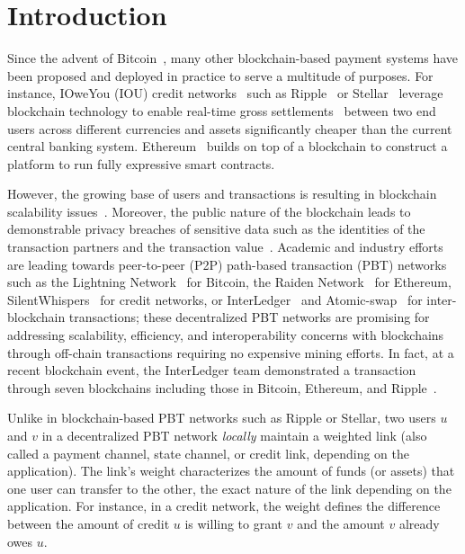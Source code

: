 \vspace{-1em}

\section{Introduction}
\label{sec:intro}

Since the advent of Bitcoin~\cite{nakamoto2011bitcoin}, many other blockchain-based 
payment systems have been proposed and deployed in practice to serve a multitude 
of purposes. For instance, IOweYou (IOU) credit networks~\cite{defigueiredo05trustdavis,Ghosh07} 
such as Ripple~\cite{ripple,armknecht2015ripple} 
or Stellar~\cite{stellar} leverage blockchain technology to enable 
real-time gross settlements~\cite{RTGS} between two end users  
across different currencies and assets significantly cheaper than the current central banking system. 
Ethereum~\cite{ethereum} builds on top of a blockchain 
to construct a platform to run fully expressive smart contracts.

However, the growing base of users and transactions is resulting in
blockchain scalability issues~\cite{Croman2016, poon2015bitcoin}. Moreover, the public nature of the blockchain 
leads to demonstrable privacy breaches of sensitive data such as the identities of the transaction partners and the transaction value~\cite{moreno2016listening, Meiklejohn2013, Kumar2017, Miller17,reid2013analysis}. 
Academic and industry efforts are leading towards peer-to-peer (P2P) %
path-based transaction (PBT) networks such as the Lightning Network~\cite{poon2015bitcoin} for Bitcoin, 
the Raiden Network~\cite{raiden} for Ethereum, 
SilentWhispers~\cite{malavolta17silent} for credit networks, or InterLedger~\cite{thomas2015protocol}  and
Atomic-swap~\cite{atomic-swap}
for inter-blockchain transactions;
 these decentralized PBT networks are promising for
addressing scalability, efficiency, and interoperability concerns with blockchains 
through off-chain transactions requiring no expensive mining efforts.
In fact, at a recent blockchain event, the InterLedger team demonstrated a transaction through seven 
blockchains including those in Bitcoin, 
Ethereum, and Ripple~\cite{sevenledgers}.

Unlike in blockchain-based PBT networks such as Ripple or Stellar,  
two users $u$ and $v$ in a decentralized PBT network \emph{locally} maintain a weighted link
(also called a payment channel, 
state channel, or credit link, depending on the application).
The link's weight characterizes the amount of funds (or assets) that one user can transfer to the other,
the exact nature of the link depending on the application.
For instance, in a credit network, the weight defines the difference between 
the amount of credit $u$ is willing to grant $v$ and the amount $v$ already
owes $u$.

